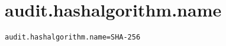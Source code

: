 \section{audit.hashalgorithm.name}
\label{configuration:AuditHashalgorithmName}
\AvailableInJavaOnly{\TODO}
\begin{lstlisting}[style=Props,caption={Usage example for \textit{audit.hashalgorithm.name}}]
audit.hashalgorithm.name=SHA-256
\end{lstlisting}